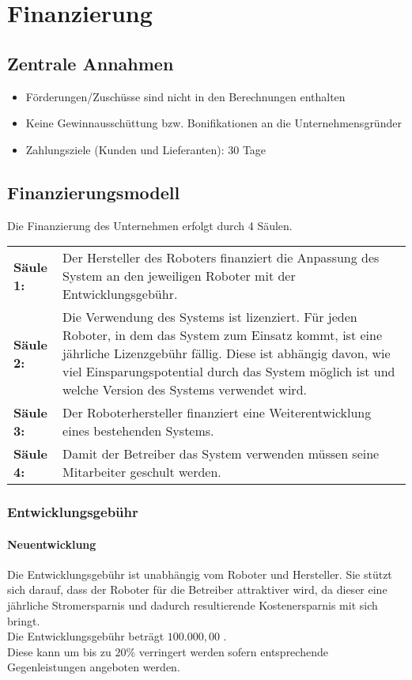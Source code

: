 \chapter{Finanzierung}
\section{Zentrale Annahmen}
\begin{itemize}
	\item Förderungen/Zuschüsse sind nicht in den Berechnungen enthalten
	\item Keine Gewinnausschüttung bzw. Bonifikationen an die Unternehmensgründer
	\item Zahlungsziele (Kunden und Lieferanten): 30 Tage
\end{itemize}

\section{Finanzierungsmodell}
Die Finanzierung des Unternehmen erfolgt durch 4 Säulen. 

\noindent
\begin{tabular}{@{}>{\raggedright\arraybackslash}p{1.8cm}@{}>{\raggedright\arraybackslash}p{\textwidth - 1.8cm}}
 
	\textbf{Säule 1:} & Der Hersteller des Roboters finanziert die Anpassung des System an den jeweiligen Roboter mit der Entwicklungsgebühr. \\ 

	\textbf{Säule 2:} & Die Verwendung des Systems ist lizenziert. Für jeden Roboter, in dem das System zum Einsatz kommt, ist eine jährliche Lizenzgebühr fällig. Diese ist abhängig davon, wie viel Einsparungspotential durch das System möglich ist und welche Version des Systems verwendet wird. \\
	
	\textbf{Säule 3:} & Der Roboterhersteller finanziert eine Weiterentwicklung eines bestehenden Systems. \\
	
	\textbf{Säule 4:} & Damit der Betreiber das System verwenden müssen seine Mitarbeiter geschult werden.
\end{tabular}

\subsection{Entwicklungsgebühr}
\subsubsection{Neuentwicklung}
Die Entwicklungsgebühr ist unabhängig vom Roboter und Hersteller. Sie stützt sich darauf, dass der Roboter für die Betreiber attraktiver wird, da dieser eine jährliche Stromersparnis und dadurch resultierende Kostenersparnis mit sich bringt.\\
Die Entwicklungsgebühr beträgt $100.000,00$ \officialeuro.\\
Diese kann um bis zu $20$\% verringert werden sofern entsprechende Gegenleistungen angeboten werden.


